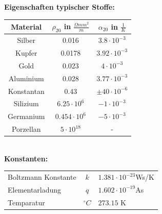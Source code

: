 \documentclass[margin=normal]{tex/hsrzf}
\begin{document}
\noindent \textbf{Eigenschaften typischer Stoffe:}\\
\begin{tabular}{|ccc|}
  \hline
  Material   & $\rho_{20}$ in $\frac{\Omega mm^2}{m}$ & $\alpha_{20}$ in $\frac{1}{K}$ \\[3pt]
  \hline
  Silber     & 0.016                                  & $3.8 \cdot 10^{-3}$            \\[3pt]
  \rowcolor[gray]{.9}
  Kupfer     & 0.0178                                 & $3.92 \cdot 10^{-3}$           \\[3pt]
  Gold       & 0.023                                  & $4 \cdot 10^{-3}$              \\[3pt]
  \rowcolor[gray]{.9}
  Aluminium  & 0.028                                  & $3.77 \cdot 10^{-3}$           \\[3pt]
  Konstantan & 0.43                                   & $\pm 40 \cdot 10^{-6}$         \\[3pt]
  \rowcolor[gray]{.9}
  Silizium   & $6.25 \cdot 10^6$                      & $-1\cdot 10^{-3} $             \\[3pt]
  Germanium  & $0.454 \cdot 10^6$                     & $-5\cdot 10^{-3} $             \\[3pt]
  \rowcolor[gray]{.9}
  Porzellan  & $5 \cdot 10^18$                        & -                              \\[3pt]
  \hline
\end{tabular}
\\

\noindent \textbf{Konstanten:} \\
\begin{tabular}{|lcl|}
  \hline
  Boltzmann Konstante & $k$        & $1.381 \cdot 10^{-23}$Ws/K \\[2pt]
  \rowcolor[gray]{.9}
  Elementarladung     & $q$        & $1.602 \cdot 10^{-19}$As   \\[2pt]
  Temparatur          & $^\circ C$ & $273.15$ K                 \\
  \hline
\end{tabular}
\end{document}
